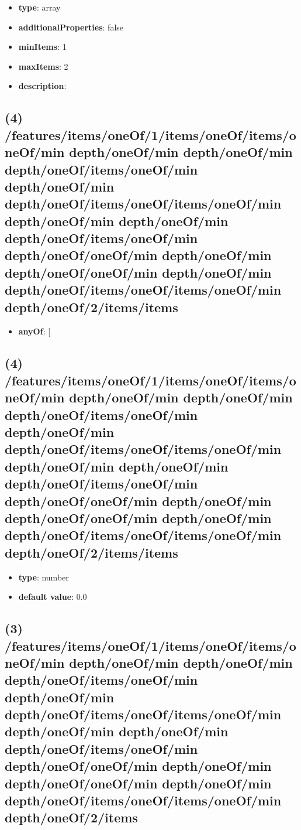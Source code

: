 \begin{itemize}[leftmargin=3em]\item {\bf type}: array
\item {\bf additionalProperties}: false
\item {\bf minItems}: 1
\item {\bf maxItems}: 2
\item {\bf description}: 
\end{itemize}\subsection{(4) /features/items/oneOf/1/items/oneOf/items/oneOf/min depth/oneOf/min depth/oneOf/min depth/oneOf/items/oneOf/min depth/oneOf/min depth/oneOf/items/oneOf/items/oneOf/min depth/oneOf/min depth/oneOf/min depth/oneOf/items/oneOf/min depth/oneOf/oneOf/min depth/oneOf/min depth/oneOf/oneOf/min depth/oneOf/min depth/oneOf/items/oneOf/items/oneOf/min depth/oneOf/2/items/items}
\begin{itemize}[leftmargin=4em]\item {\bf anyOf}: [\end{itemize}\subsection{(4) /features/items/oneOf/1/items/oneOf/items/oneOf/min depth/oneOf/min depth/oneOf/min depth/oneOf/items/oneOf/min depth/oneOf/min depth/oneOf/items/oneOf/items/oneOf/min depth/oneOf/min depth/oneOf/min depth/oneOf/items/oneOf/min depth/oneOf/oneOf/min depth/oneOf/min depth/oneOf/oneOf/min depth/oneOf/min depth/oneOf/items/oneOf/items/oneOf/min depth/oneOf/2/items/items}
\begin{itemize}[leftmargin=4em]\item {\bf type}: number\item {\bf default value}: 0.0
\end{itemize}\subsection{(3) /features/items/oneOf/1/items/oneOf/items/oneOf/min depth/oneOf/min depth/oneOf/min depth/oneOf/items/oneOf/min depth/oneOf/min depth/oneOf/items/oneOf/items/oneOf/min depth/oneOf/min depth/oneOf/min depth/oneOf/items/oneOf/min depth/oneOf/oneOf/min depth/oneOf/min depth/oneOf/oneOf/min depth/oneOf/min depth/oneOf/items/oneOf/items/oneOf/min depth/oneOf/2/items}
